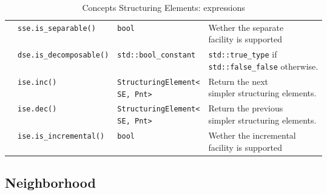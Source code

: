 \begin{table}[!htbp]
\begin{scriptsize}
\begin{tabular}{llll}
      \multicolumn{1}{c|}{}                                     & \texttt{sse.is\_separable()}                          & \texttt{bool}                             & \makecell[l]{Wether the separate        \\ facility is supported}\\
      \cline{1-4}
      \multicolumn{1}{c|}{\multirow{4}{*}{\makecell[l]{Incremental                                                                                                                                            \\StructuringElement}}} & \texttt{dse.is\_decomposable()} & \texttt{std::bool\_constant} & \makecell[l]{\texttt{std::true\_type} if \\ \texttt{std::false\_false} otherwise.}\\
      \multicolumn{1}{c|}{}                                     & \texttt{ise.inc()}                                    & \makecell[l]{\texttt{StructuringElement<}                                           \\\texttt{SE, Pnt>}} & \makecell[l]{Return the next            \\ simpler structuring elements.}\\
      \multicolumn{1}{c|}{}                                     & \texttt{ise.dec()}                                    & \makecell[l]{\texttt{StructuringElement<}                                           \\\texttt{SE, Pnt>}} & \makecell[l]{Return the previous        \\ simpler structuring elements.}\\
      \multicolumn{1}{c|}{}                                     & \texttt{ise.is\_incremental()}                        & \texttt{bool}                             & \makecell[l]{Wether the incremental     \\ facility is supported}\\
      \cline{1-4}
    \end{tabular}
    \smallskip

    \caption{Concepts Structuring Elements: expressions}
  \end{scriptsize}
  \label{concept.tables.se.expressions}
\end{table}

\subsection{Neighborhood}
\label{image_and_algorithms_taxonomy.concepts.subsec.neighborhood}

